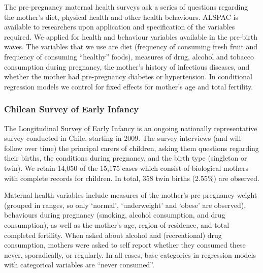 \documentclass{nature}
\begin{document}
\begin{linenumbers}
The pre-pregnancy maternal health surveys ask a series of questions regarding the mother's diet, physical health and other health behaviours.  ALSPAC is available to researchers upon application and specification of the variables required. We applied for health and behaviour variables available in the pre-birth waves. The variables that we use are diet (frequency of consuming fresh fruit and frequency of consuming ``healthy'' foods), measures of drug, alcohol and tobacco consumption during pregnancy, the mother's history of infectious diseases, and whether the mother had pre-pregnancy diabetes or hypertension. In conditional regression models we control for fixed effects for mother's age and total fertility.

\subsubsection{Chilean Survey of Early Infancy}

The Longitudinal Survey of Early Infancy is an ongoing nationally representative survey conducted in Chile, starting in 2009.  The survey interviews (and will follow over time) the principal carers of children, asking them questions regarding their births, the conditions during pregnancy, and the birth type (singleton or twin). We retain 14,050 of the 15,175 cases which consist of biological mothers with complete records for children. In total, 358 twin births (2.55\%) are observed.

Maternal health variables include measures of the mother's pre-pregnancy weight (grouped in ranges, so only `normal', `underweight' and `obese' are observed), behaviours during pregnancy (smoking, alcohol consumption, and drug consumption), as well as the mother's age, region of residence, and total completed fertility.  When asked about alcohol and (recreational) drug consumption, mothers were asked to self report whether they consumed these never, sporadically, or regularly.  In all cases, base categories in regression models with categorical variables are ``never consumed''. %


\end{linenumbers}
\end{document}
